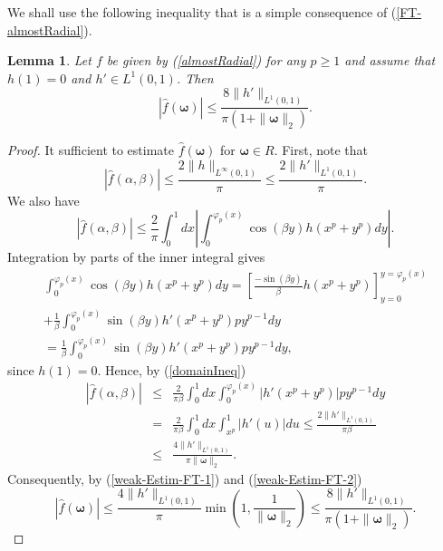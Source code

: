 \documentclass{amsart}
\newtheorem{lem}[theorem]{Lemma}
\numberwithin{equation}{section}
\begin{document}
We shall use the following inequality that is a simple consequence of (\ref{FT-almostRadial}).
\begin{lem}
\label{weak-Estim-Lem}
Let $f$ be given by (\ref{almostRadial}) for any $p\ge1$ and assume that $h(1)=0$ and $h'\in L^1(0,1)$. Then
\begin{equation}
    \label{weak-Estim-FT}
    |\widehat{f}(\boldsymbol{\omega})|\le\frac{8\|h'\|_{L^1(0,1)}}{\pi(1+\|\boldsymbol{\omega}\|_2)}.
\end{equation}
\end{lem}
\begin{proof}
It sufficient to estimate $\widehat{f}(\boldsymbol{\omega})$ for $\boldsymbol{\omega}\in R$. First, note that
\begin{equation}
    \label{weak-Estim-FT-1}
    |\widehat{f}(\alpha,\beta)|\le\frac{2\|h\|_{L^\infty(0,1)}}{\pi}\le\frac{2\|h'\|_{L^1(0,1)}}{\pi}.
\end{equation}
We also have
\begin{equation}
    \nonumber
    |\widehat{f}(\alpha,\beta)|\le\frac{2}{\pi}\int_0^1dx\left|\int_0^{\varphi_p(x)}\cos(\beta y)h(x^p+y^p)dy\right|.
\end{equation}
Integration by parts of the inner integral gives
\begin{align}
\nonumber
\int_0^{\varphi_p(x)}\cos(\beta y)h(x^p+y^p)dy=\left[\frac{-\sin(\beta y)}{\beta}h(x^p+y^p)\right]_{y=0}^{y=\varphi_p(x)}\\
\nonumber
+\frac{1}{\beta}\int_0^{\varphi_p(x)}\sin(\beta y)h'(x^p+y^p)py^{p-1}dy\\
\nonumber
=\frac{1}{\beta}\int_0^{\varphi_p(x)}\sin(\beta y)h'(x^p+y^p)py^{p-1}dy,
\end{align}
since $h(1)=0$.
Hence, by (\ref{domainIneq})
\begin{eqnarray}
    \nonumber
    |\widehat{f}(\alpha,\beta)|&\le&\frac{2}{\pi\beta}\int_0^1dx\int_0^{\varphi_p(x)}|h'(x^p+y^p)|py^{p-1}dy\\
    \nonumber
    &=&\frac{2}{\pi\beta}\int_0^1dx\int_{x^p}^1|h'(u)|du\le \frac{2\|h'\|_{L^1(0,1)}}{\pi\beta}\\
    \label{weak-Estim-FT-2}
    &\le&\frac{4\|h'\|_{L^1(0,1)}}{\pi\|\boldsymbol{\omega}\|_2}.
\end{eqnarray}
Consequently, by (\ref{weak-Estim-FT-1}) and (\ref{weak-Estim-FT-2})
$$
|\widehat{f}(\boldsymbol{\omega})|\le\frac{4\|h'\|_{L^1(0,1)}}{\pi}\min\left(1,\frac{1}{\|\boldsymbol{\omega}\|_2}\right)\le\frac{8\|h'\|_{L^1(0,1)}}{\pi(1+\|\boldsymbol{\omega}\|_2)}.
$$
\end{proof}
\end{document}
